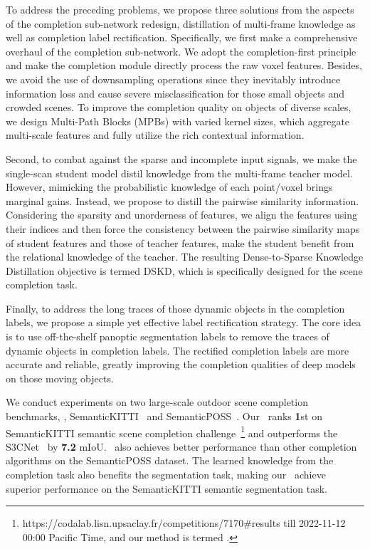\documentclass[10pt,twocolumn,letterpaper]{article}
\begin{document}
To address the preceding problems, we propose three solutions from the aspects of the completion sub-network redesign, distillation of multi-frame knowledge as well as completion label rectification. Specifically, we first make a comprehensive overhaul of the completion sub-network. We adopt the completion-first principle and make the completion module directly process the raw voxel features. Besides, we avoid the use of downsampling operations since they inevitably introduce information loss and cause severe misclassification for those small objects and crowded scenes. To improve the completion quality on objects of diverse scales, we design Multi-Path Blocks (MPBs) with varied kernel sizes, which aggregate multi-scale features and fully utilize the rich contextual information.

Second, to combat against the sparse and incomplete input signals, we make the single-scan student model distil knowledge from the multi-frame teacher model. However, mimicking the probabilistic knowledge of each point/voxel brings marginal gains. Instead, we propose to distill the pairwise similarity information. Considering the sparsity and unorderness of features, we align the features using their indices and then force the consistency between the pairwise similarity maps of student features and those of teacher features, make the student benefit from the relational knowledge of the teacher. The resulting Dense-to-Sparse Knowledge Distillation objective is termed DSKD, which is specifically designed for the scene completion task.

Finally, to address the long traces of those dynamic objects in the completion labels, we propose a simple yet effective label rectification strategy. The core idea is to use off-the-shelf panoptic segmentation labels to remove the traces of dynamic objects in completion labels. The rectified completion labels are more accurate and reliable, greatly improving the completion qualities of deep models on those moving objects.



We conduct experiments on two large-scale outdoor scene completion benchmarks, \ie, SemanticKITTI~\cite{behley2019semantickitti} and SemanticPOSS~\cite{semanticposs}. Our \algorithmname~ranks \textbf{1}st on SemanticKITTI semantic scene completion challenge~\footnote{https://codalab.lisn.upsaclay.fr/competitions/7170\#results till 2022-11-12 00:00 Pacific Time, and our method is termed \algorithmname.} and outperforms the S3CNet~\cite{s3cnet} by \textbf{7.2} mIoU. \algorithmname~also achieves better performance than other completion algorithms on the SemanticPOSS dataset. The learned knowledge from the completion task also benefits the segmentation task, making our \algorithmname~achieve superior performance on the SemanticKITTI semantic segmentation task.
\end{document}
